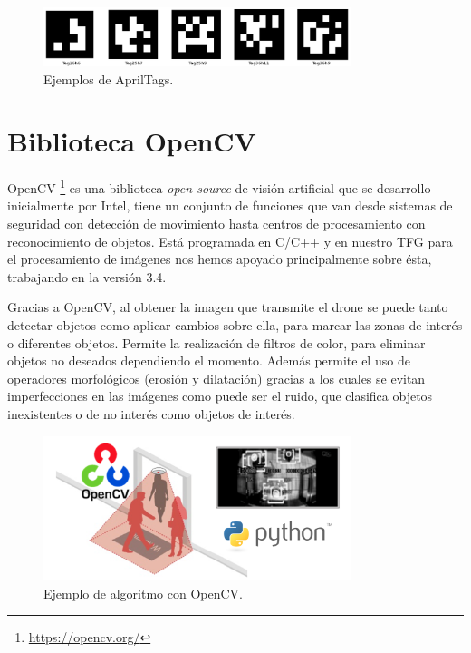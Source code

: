 \begin{figure}[H]
	\begin{center}
		\includegraphics[width=0.8\textwidth]{imag/IMG25.png}
				\caption{Ejemplos de AprilTags.} 
	\label{fig:AprilTags.}	
	\end{center}
\end{figure}

\section{Biblioteca OpenCV}
\hspace{1cm} OpenCV \footnote{\url{https://opencv.org/}} es una biblioteca \textit{open-source} de visión artificial que se desarrollo inicialmente por Intel, tiene un conjunto de funciones que van desde sistemas de seguridad con detección de movimiento hasta centros de procesamiento con reconocimiento de objetos. Está programada en C/C++ y en nuestro TFG para el procesamiento de imágenes nos hemos apoyado principalmente sobre ésta, trabajando en la versión 3.4. 

\hspace{1cm} Gracias a OpenCV, al obtener la imagen que transmite el drone se puede tanto detectar objetos como aplicar cambios sobre ella, para marcar las zonas de interés o diferentes objetos. Permite la realización de filtros de color, para eliminar objetos no deseados dependiendo el momento. Además permite el uso de operadores morfológicos (erosión y dilatación) gracias a los cuales se evitan imperfecciones en las imágenes como puede ser el ruido, que clasifica objetos inexistentes o de no interés como objetos de interés.
\\

\begin{figure}[H]
	\begin{center}
		\includegraphics[width=0.8\textwidth]{imag/IMG26.png}
				\caption{Ejemplo de algoritmo con OpenCV.} 
	\label{fig:OpenCV.}	
	\end{center}
\end{figure}

